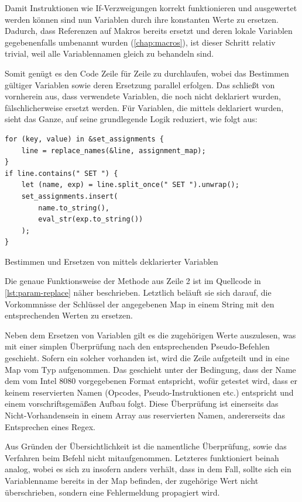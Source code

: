 Damit Instruktionen wie If-Verzweigungen korrekt funktionieren und ausgewertet werden können sind nun Variablen durch ihre konstanten Werte zu ersetzen. Dadurch, dass Referenzen auf Makros bereits ersetzt und deren lokale Variablen gegebenenfalls umbenannt wurden (\ref{chap:macros}), ist dieser Schritt relativ trivial, weil alle Variablennamen gleich zu behandeln sind.

Somit genügt es den Code Zeile für Zeile zu durchlaufen, wobei das Bestimmen gültiger Variablen sowie deren Ersetzung parallel erfolgen. Das schließt von vornherein aus, dass verwendete Variablen, die noch nicht deklariert wurden, fälschlicherweise ersetzt werden. Für Variablen, die mittels  deklariert wurden, sieht das Ganze, auf seine grundlegende Logik reduziert, wie folgt aus:

\begin{listing}[th]
\begin{verbatim}
for (key, value) in &set_assignments {
    line = replace_names(&line, assignment_map);
}
if line.contains(" SET ") {
    let (name, exp) = line.split_once(" SET ").unwrap();
    set_assignments.insert(
        name.to_string(),
        eval_str(exp.to_string())
    );
}
\end{verbatim}
\label{lst:var-replacement}
\caption{Bestimmen und Ersetzen von mittels  deklarierter Variablen}
\end{listing}

Die genaue Funktionsweise der Methode  aus Zeile 2 ist im Quellcode in \ref{lst:param-replace} näher beschrieben. Letztlich beläuft sie sich darauf, die Vorkommnisse der Schlüssel der angegebenen Map in einem String mit den entsprechenden Werten zu ersetzen.

Neben dem Ersetzen von Variablen gilt es die zugehörigen Werte auszulesen, was mit einer simplen Überprüfung nach den entsprechenden Pseudo-Befehlen geschieht. Sofern ein solcher vorhanden ist, wird die Zeile aufgeteilt und in eine Map vom Typ  aufgenommen. Das geschieht unter der Bedingung, dass der Name dem vom Intel 8080 vorgegebenen Format entspricht, wofür getestet wird, dass er keinem reservierten Namen (Opcodes, Pseudo-Instruktionen etc.) entspricht und einem vorschriftsgemäßen Aufbau folgt. Diese Überprüfung ist einerseits das Nicht-Vorhandensein in einem Array aus reservierten Namen, andererseits das Entsprechen eines Regex.

Aus Gründen der Übersichtlichkeit ist die namentliche Überprüfung, sowie das Verfahren beim Befehl  nicht mitaufgenommen. Letzteres funktioniert beinah analog, wobei es sich zu  insofern anders verhält, dass in dem Fall, sollte sich ein Variablenname bereits in der Map befinden, der zugehörige Wert nicht überschrieben, sondern eine Fehlermeldung propagiert wird.

